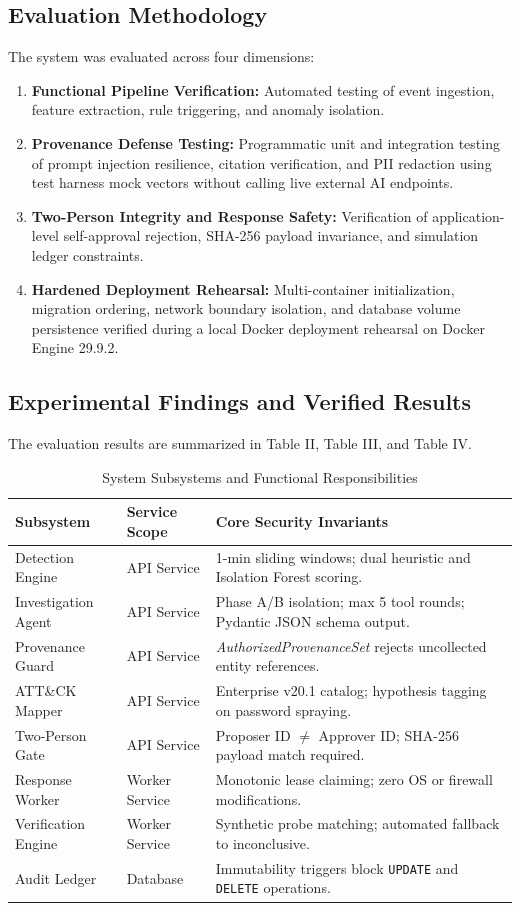 \documentclass[conference]{IEEEtran}
\begin{document}
\subsection{Evaluation Methodology}
The system was evaluated across four dimensions:
\begin{enumerate}
    \item \textbf{Functional Pipeline Verification:} Automated testing of event ingestion, feature extraction, rule triggering, and anomaly isolation.
    \item \textbf{Provenance Defense Testing:} Programmatic unit and integration testing of prompt injection resilience, citation verification, and PII redaction using test harness mock vectors without calling live external AI endpoints.
    \item \textbf{Two-Person Integrity and Response Safety:} Verification of application-level self-approval rejection, SHA-256 payload invariance, and simulation ledger constraints.
    \item \textbf{Hardened Deployment Rehearsal:} Multi-container initialization, migration ordering, network boundary isolation, and database volume persistence verified during a local Docker deployment rehearsal on Docker Engine 29.9.2.
\end{enumerate}

\subsection{Experimental Findings and Verified Results}
The evaluation results are summarized in Table II, Table III, and Table IV.

\begin{table}[t]
\caption{System Subsystems and Functional Responsibilities}
\label{tab:components}
\centering
\begin{tabular}{llp{4.2cm}}
\toprule
\textbf{Subsystem} & \textbf{Service Scope} & \textbf{Core Security Invariants} \\
\midrule
Detection Engine & API Service & 1-min sliding windows; dual heuristic and Isolation Forest scoring. \\
Investigation Agent & API Service & Phase A/B isolation; max 5 tool rounds; Pydantic JSON schema output. \\
Provenance Guard & API Service & \textit{AuthorizedProvenanceSet} rejects uncollected entity references. \\
ATT\&CK Mapper & API Service & Enterprise v20.1 catalog; hypothesis tagging on password spraying. \\
Two-Person Gate & API Service & Proposer ID $\neq$ Approver ID; SHA-256 payload match required. \\
Response Worker & Worker Service & Monotonic lease claiming; zero OS or firewall modifications. \\
Verification Engine & Worker Service & Synthetic probe matching; automated fallback to inconclusive. \\
Audit Ledger & Database & Immutability triggers block \texttt{UPDATE} and \texttt{DELETE} operations. \\
\bottomrule
\end{tabular}
\end{table}
\end{document}
